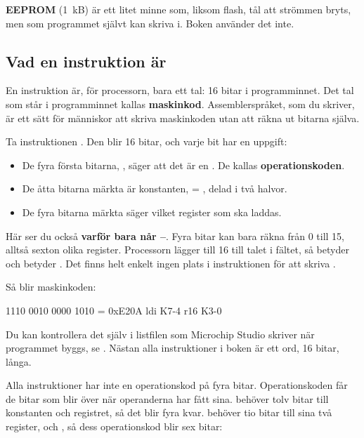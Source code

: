 \textbf{EEPROM} (1~kB) är ett litet minne som, liksom flash, tål att strömmen bryts, men som
programmet självt kan skriva i. Boken använder det inte.

\subsection{Vad en instruktion är}
\label{c7:a6}
En instruktion är, för processorn, bara ett tal: 16 bitar i programminnet. Det tal som står i
programminnet kallas \textbf{maskinkod}. Assemblerspråket, som du skriver, är ett sätt för
människor att skriva maskinkoden utan att räkna ut bitarna själva.

Ta instruktionen . Den blir 16 bitar, och varje bit har en uppgift:


\begin{itemize}
  \item De fyra första bitarna, , säger att det är en . De kallas
    \textbf{operationskoden}.
  \item De åtta bitarna märkta  är konstanten,  = , delad i två
    halvor.
  \item De fyra bitarna märkta  säger vilket register som ska laddas.
\end{itemize}

Här ser du också \textbf{varför  bara når --}. Fyra bitar kan bara
räkna från 0 till 15, alltså sexton olika register. Processorn lägger till 16 till talet i fältet,
så  betyder  och  betyder . Det finns helt enkelt ingen
plats i instruktionen för att skriva .

Så  blir maskinkoden:

\begin{textdrawing}
1110  0010  0000  1010   =   0xE20A
 ldi  K7-4   r16  K3-0
\end{textdrawing}

Du kan kontrollera det själv i listfilen som Microchip Studio skriver när programmet byggs, se
. Nästan alla instruktioner i boken är ett ord, 16 bitar, långa.

Alla instruktioner har inte en operationskod på fyra bitar. Operationskoden får de bitar som blir
över när operanderna har fått sina.  behöver tolv bitar till konstanten och registret,
så det blir fyra kvar.  behöver tio bitar till sina två register,  och ,
så dess operationskod blir sex bitar:

